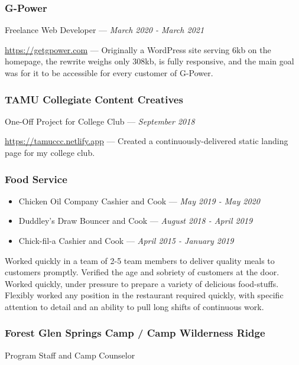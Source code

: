\documentclass[letterpaper,10pt]{article}
\providecommand{\tightlist}
  {\setlength{\itemsep}{4pt}\setlength{\parskip}{0pt}}
\begin{document}
    \subsubsection{G-Power}
    \hfill Freelance Web Developer --- \emph{March 2020 - March 2021}

    \href{https://getgpower.com}{https://getgpower.com} --- Originally a WordPress site serving 6kb on the homepage, the rewrite weighs only 308kb, is fully responsive, and the main goal was for it to be accessible for every customer of G-Power.

    \subsubsection{TAMU Collegiate Content Creatives}
    \hfill One-Off Project for College Club --- \emph{September 2018}

    \href{https://tamuccc.netlify.app}{https://tamuccc.netlify.app} --- Created a continuously-delivered static landing page for my college club.

    \subsubsection{Food Service}
    
    \begin{itemize}
        \tightlist{}
        \item
        Chicken Oil Company
        \hfill Cashier and Cook --- \emph{May 2019 - May 2020}

        \item
        Duddley's Draw
        \hfill Bouncer and Cook --- \emph{August 2018 - April 2019}

        \item
        Chick-fil-a
        \hfill Cashier and Cook --- \emph{April 2015 - January 2019}
    \end{itemize}

    Worked quickly in a team of 2-5 team members to deliver quality meals to customers promptly. Verified the age and sobriety of customers at the door. Worked quickly, under pressure to prepare a variety of delicious food-stuffs.  Flexibly worked any position in the restaurant required quickly, with specific attention to detail and an ability to pull long shifts of continuous work.

    \subsubsection{Forest Glen Springs Camp / Camp Wilderness Ridge}
    \hfill Program Staff and Camp Counselor 
    
\end{document}
